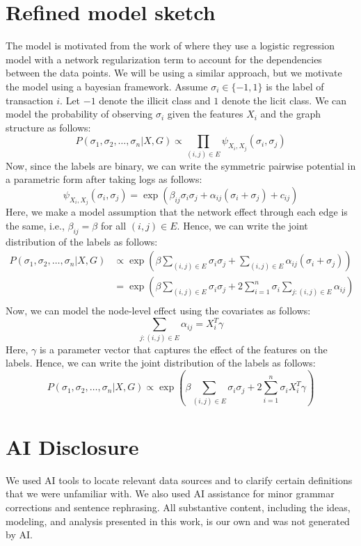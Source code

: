 \documentclass[11pt,reqno]{amsart}
\begin{document}
\section{Refined model sketch}
The model is motivated from the work of \cite{daskalakis2020logistic,mukherjee2024logistic} where they use a logistic regression model with a network regularization term to account for the dependencies between the data points. We will be using a similar approach, but we motivate the model using a bayesian framework. Assume $\sigma_i \in \{-1, 1\}$ is the label of transaction $i$. Let $-1$ denote the illicit class and $1$ denote the licit class. We can model the probability of observing $\sigma_i$ given the features $X_i$ and the graph structure as follows:
\begin{equation}
    P(\sigma_1, \sigma_2, \ldots, \sigma_n | X,G) \propto \prod_{(i,j) \in E} \psi_{X_i, X_j}(\sigma_i, \sigma_j)
\end{equation}
Now, since the labels are binary, we can write the symmetric pairwise potential in a parametric form after taking logs as follows:
\begin{equation}
    \psi_{X_i,X_j}(\sigma_i, \sigma_j) = \exp\left(\beta_{ij} \sigma_i \sigma_j + \alpha_{ij} (\sigma_i + \sigma_j) +c_{ij}\right)
\end{equation}
Here, we make a model assumption that the network effect through each edge is the same, i.e., $\beta_{ij} = \beta$ for all $(i,j) \in E$. Hence, we can write the joint distribution of the labels as follows:
\begin{align*}
    P(\sigma_1, \sigma_2, \ldots, \sigma_n | X,G) & \propto \exp\left(\beta \sum_{(i,j) \in E} \sigma_i \sigma_j + \sum_{(i,j) \in E} \alpha_{ij} (\sigma_i + \sigma_j)\right) \\
                                                  & = \exp\left(\beta \sum_{(i,j) \in E} \sigma_i \sigma_j + 2\sum_{i=1}^n \sigma_i \sum_{j: (i,j) \in E} \alpha_{ij}\right)   \\
\end{align*}
Now, we can model the node-level effect using the covariates as follows:
\begin{equation}
    \sum_{j: (i,j) \in E} \alpha_{ij} = X_i^T \gamma
\end{equation}
Here, $\gamma$ is a parameter vector that captures the effect of the features on the labels. Hence, we can write the joint distribution of the labels as follows:
\begin{equation}
    P(\sigma_1, \sigma_2, \ldots, \sigma_n | X,G) \propto \exp\left(\beta \sum_{(i,j) \in E} \sigma_i \sigma_j + 2\sum_{i=1}^n \sigma_i X_i^T \gamma\right)
\end{equation}



\section{AI Disclosure}
We used AI tools to locate relevant data sources and to clarify certain definitions that we were unfamiliar with. We also used AI assistance for minor grammar corrections and sentence rephrasing. All substantive content, including the ideas, modeling, and analysis presented in this work, is our own and was not generated by AI.
\end{document}
